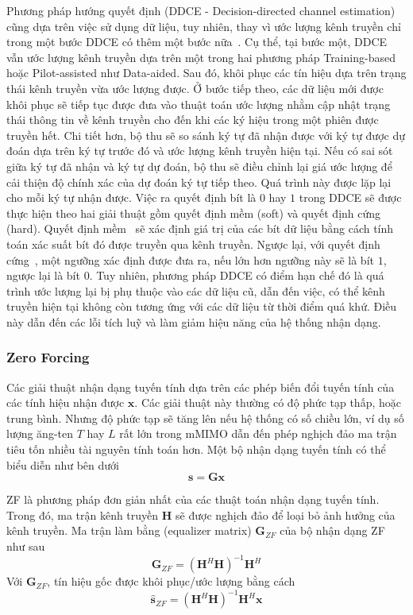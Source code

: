 Phương pháp hướng quyết định (DDCE - Decision-directed channel estimation) cũng dựa trên việc sử dụng dữ liệu, tuy nhiên, thay vì ước lượng kênh truyền chỉ trong một bước DDCE có thêm một bước nữa~\cite{vilas2022}. Cụ thể, tại bước một, DDCE vẫn ước lượng kênh truyền dựa trên một trong hai phương pháp Training-based hoặc Pilot-assisted như Data-aided. Sau đó, khôi phục các tín hiệu dựa trên trạng thái kênh truyền vừa ước lượng được. Ở bước tiếp theo, các dữ liệu mới được khôi phục sẽ tiếp tục được đưa vào thuật toán ước lượng nhằm cập nhật trạng thái thông tin về kênh truyền cho đến khi các ký hiệu trong một phiên được truyền hết. Chi tiết hơn, bộ thu sẽ so sánh ký tự đã nhận được với ký tự được dự đoán dựa trên ký tự trước đó và ước lượng kênh truyền hiện tại. Nếu có sai sót giữa ký tự đã nhận và ký tự dự đoán, bộ thu sẽ điều chỉnh lại giá ước lượng để cải thiện độ chính xác của dự đoán ký tự tiếp theo. Quá trình này được lặp lại cho mỗi ký tự nhận được. Việc ra quyết định bít là $0$ hay $1$ trong DDCE sẽ được thực hiện theo hai giải thuật gồm quyết định mềm (soft) và quyết định cứng (hard). Quyết định mềm~\cite{Park2015} sẽ xác định giá trị của các bít dữ liệu bằng cách tính toán xác suất bít đó được truyền qua kênh truyền. Ngược lại, với quyết định cứng~\cite{Kai2005}, một ngưỡng xác định được đưa ra, nếu lớn hơn ngưỡng này sẽ là bít $1$, ngược lại là bít $0$. Tuy nhiên, phương pháp DDCE có điểm hạn chế đó là quá trình ước lượng lại bị phụ thuộc vào các dữ liệu cũ, dẫn đến việc, có thể kênh truyền hiện tại không còn tương ứng với các dữ liệu từ thời điểm quá khứ. Điều này dẫn đến các lỗi tích luỹ và làm giảm hiệu năng của hệ thống nhận dạng.

\subsubsection{Zero Forcing} \label{sec:zf}

Các giải thuật nhận dạng tuyến tính dựa trên các phép biến đổi tuyến tính của các tính hiệu nhận được $\mathbf{x}$. Các giải thuật này thường có độ phức tạp thấp, hoặc trung bình. Nhưng độ phức tạp sẽ tăng lên nếu hệ thống có số chiều lớn, ví dụ số lượng ăng-ten $T$ hay $L$ rất lớn trong mMIMO dẫn đến phép nghịch đảo ma trận tiêu tốn nhiều tài nguyên tính toán hơn. Một bộ nhận dạng tuyến tính có thể biểu diễn như bên dưới
\begin{equation}
    \mathbf{s} = \mathbf{G} \mathbf{x}
\end{equation}

ZF là phương pháp đơn giản nhất của các thuật toán nhận dạng tuyến tính. Trong đó, ma trận kênh truyền $\mathbf{H}$ sẽ được nghịch đảo để loại bỏ ảnh hưởng của kênh truyền. Ma trận làm bằng (equalizer matrix) $\mathbf{G}_{ZF}$ của bộ nhận dạng ZF như sau
\begin{equation}
    \mathbf{G}_{ZF}=\left(\mathbf{H}^H \mathbf{H}\right)^{-1} \mathbf{H}^H
\end{equation}
Với $\mathbf{G}_{ZF}$, tín hiệu gốc được khôi phục/ước lượng bằng cách
\begin{equation}
    \hat{\mathbf{s}}_{ZF}=\left(\mathbf{H}^H \mathbf{H}\right)^{-1} \mathbf{H}^H \mathbf{x}
\end{equation}

